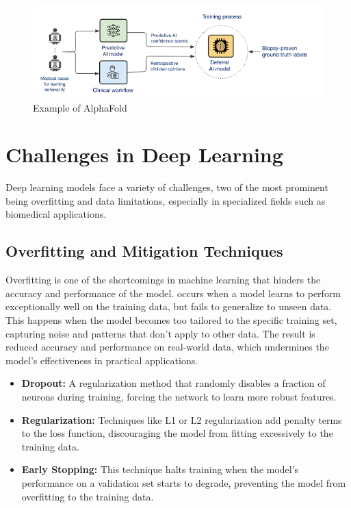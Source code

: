 \documentclass{llncs}
\begin{document}
\begin{figure}[h!]
	\begin{center}  %
		\includegraphics[width=1\textwidth]{images/deepmind.png}
		\caption{Example of AlphaFold\cite{alphafoldpaperswithcode}}
		\label{fig:deep}
	\end{center}
\end{figure}


\section{Challenges in Deep Learning}

Deep learning models face a variety of challenges, two of the most prominent being overfitting and data limitations, especially in specialized fields such as biomedical applications.


\subsection{Overfitting and Mitigation Techniques}

Overfitting is one of the shortcomings in machine learning that hinders the accuracy and performance of the model. occurs when a model learns to perform exceptionally well on the training data, but fails to generalize to unseen data. This happens when the model becomes too tailored to the specific training set, capturing noise and patterns that don't apply to other data. The result is reduced accuracy and performance on real-world data, which undermines the model's effectiveness in practical applications.\cite{overfittingprotecciondatos}

\begin{itemize}
	\item \textbf{Dropout:} A regularization method that randomly disables a fraction of neurons during training, forcing the network to learn more robust features.
	\item \textbf{Regularization:} Techniques like L1 or L2 regularization add penalty terms to the loss function, discouraging the model from fitting excessively to the training data.
	\item \textbf{Early Stopping:} This technique halts training when the model's performance on a validation set starts to degrade, preventing the model from overfitting to the training data.
\end{itemize}
\end{document}
